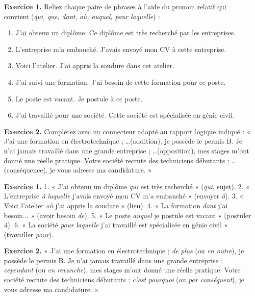 \documentclass[11pt]{article}
\begin{document}
\begin{exercice}
\textbf{Exercice 1.} Reliez chaque paire de phrases à l'aide du pronom relatif qui convient (\emph{qui, que, dont, où, auquel, pour laquelle}) :
\begin{enumerate}
\item J'ai obtenu un diplôme. Ce diplôme est très recherché par les entreprises.
\item L'entreprise m'a embauché. J'avais envoyé mon CV à cette entreprise.
\item Voici l'atelier. J'ai appris la soudure dans cet atelier.
\item J'ai suivi une formation. J'ai besoin de cette formation pour ce poste.
\item Le poste est vacant. Je postule à ce poste.
\item J'ai travaillé pour une société. Cette société est spécialisée en génie civil.
\end{enumerate}
\textbf{Exercice 2.} Complétez avec un connecteur adapté au rapport logique indiqué : « J'ai une formation en électrotechnique ; \dots (addition), je possède le permis B. Je n'ai jamais travaillé dans une grande entreprise ; \dots (opposition), mes stages m'ont donné une réelle pratique. Votre société recrute des techniciens débutants ; \dots (conséquence), je vous adresse ma candidature. »
\end{exercice}

\begin{corrige}[Exercice 1 et 2]
\textbf{Exercice 1.} 1. « J'ai obtenu un diplôme \emph{qui} est très recherché » (\emph{qui}, sujet). 2. « L'entreprise \emph{à laquelle} j'avais envoyé mon CV m'a embauché » (envoyer \emph{à}). 3. « Voici l'atelier \emph{où} j'ai appris la soudure » (lieu). 4. « La formation \emph{dont} j'ai besoin... » (avoir besoin \emph{de}). 5. « Le poste \emph{auquel} je postule est vacant » (postuler \emph{à}). 6. « La société \emph{pour laquelle} j'ai travaillé est spécialisée en génie civil » (travailler \emph{pour}).

\textbf{Exercice 2.} « J'ai une formation en électrotechnique ; \emph{de plus} (ou \emph{en outre}), je possède le permis B. Je n'ai jamais travaillé dans une grande entreprise ; \emph{cependant} (ou \emph{en revanche}), mes stages m'ont donné une réelle pratique. Votre société recrute des techniciens débutants ; \emph{c'est pourquoi} (ou \emph{par conséquent}), je vous adresse ma candidature. »
\end{corrige}
\end{document}
